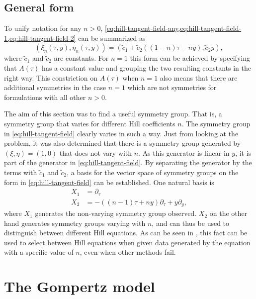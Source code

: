 \subsection{General form}

To unify notation for any \(n>0\), \cref{eq:hill-tangent-field-any,eq:hill-tangent-field-1,eq:hill-tangent-field-2} can be summarized as
\begin{equation} \label{eq:hill-tangent-field}
  \left(\xi_n(\tau,y),\eta_n(\tau,y)\right) = 
  \left(\tilde{c}_1 + \tilde{c}_2 \left( (1-n) \tau - n y \right), \tilde{c}_2 y\right),
\end{equation}
where \(\tilde{c}_1\) and \(\tilde{c}_2\) are constants.
For \(n=1\) this form can be achieved by specifying that \(A(\tau)\) has a constant value and grouping the two resulting constants in the right way.
This constriction on \(A(\tau)\) when \(n=1\) also means that there are additional symmetries in the case \(n=1\) which are not symmetries for formulations with all other \(n>0\).

The aim of this section was to find a useful symmetry group.
That is, a symmetry group that varies for different Hill coefficients \(n\).
The symmetry group in \cref{eq:hill-tangent-field} clearly varies in such a way.
Just from looking at the problem, it was also determined that there is a symmetry group generated by \(\left(\xi,\eta\right) = \left(1,0\right)\) that does not vary with \(n\).
As this generator is linear in \(y\), it is part of the generator in \cref{eq:hill-tangent-field}.
By separating the generator by the terms with \(\tilde{c}_1\) and \(\tilde{c}_2\), a basis for the vector space of symmetry groups on the form in \cref{eq:hill-tangent-field} can be established.
One natural basis is
\begin{align*}
  X_1 &= \partial_\tau \\
  X_2 &= - \left( (n-1) \tau + n y \right) \partial_\tau + y \partial_y,
\end{align*}
where \(X_1\) generates the non-varying symmetry group observed.
\(X_2\) on the other hand generates symmetry groups varying with \(n\), and can thus be used to distinguish between different Hill equations.
As can be seen in \cite{ohlsson2020symmetry}, this fact can be used to select between Hill equations when given data generated by the equation with a specific value of \(n\), even when other methods fail.

\section{The Gompertz model}

